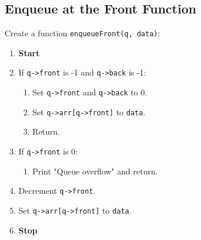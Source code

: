 {  \subsection{Enqueue at the Front Function}
  Create a function \texttt{enqueueFront(q, data)}:
  \begin{enumerate}[label=\arabic*:,left=0pt]
    \item \textbf{Start}
    \item If \texttt{q->front} is -1 and \texttt{q->back} is -1:
          \begin{enumerate}[label=2.\arabic*.]
            \item Set \texttt{q->front} and \texttt{q->back} to 0.
            \item Set \texttt{q->arr[q->front]} to \texttt{data}.
            \item Return.
          \end{enumerate}
    \item If \texttt{q->front} is 0:
          \begin{enumerate}[label=2.\arabic*.]
            \item Print "Queue overflow" and return.
          \end{enumerate}
    \item Decrement \texttt{q->front}.
    \item Set \texttt{q->arr[q->front]} to \texttt{data}.
    \item \textbf{Stop}
  \end{enumerate}

}
